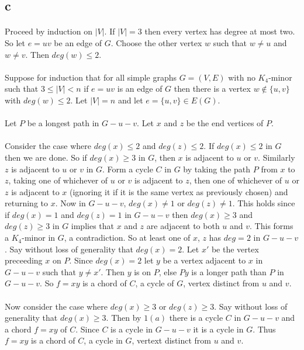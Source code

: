 \documentclass[letterpaper,12pt,oneside,onecolumn]{report}
\begin{document}
\subsection*{c}
\paragraph{}
Proceed by induction on $|V|$. If $|V|=3$ then every vertex has degree at most two. So let $e=uv$ be an edge of $G$. Choose the other vertex $w$ such that $w \neq u$ and $w \neq v$. Then $deg(w) \leq 2$.
\paragraph{}
Suppose for induction that for all simple graphs $G=(V,E)$ with no $K_4$-minor such that $3 \leq |V| < n$ if $e=uv$ is an edge of $G$ then there is a vertex $w \not\in \{u,v\}$ with $deg(w) \leq 2$. 
Let $|V| = n$ and let $e = \{u,v\} \in E(G)$.
\paragraph{} 
Let $P$ be a longest path in $G - u - v$. Let $x$ and $z$ be the end vertices of $P$.
\paragraph{}
Consider the case where $deg(x) \leq 2$ and $deg(z) \leq 2$. If $deg(x) \leq 2$ in $G$ then we are done. So if $deg(x) \geq 3$ in $G$, then $x$ is adjacent to $u$ or $v$. Similarly $z$ is adjacent to $u$ or $v$ in $G$. Form a cycle $C$ in $G$ by taking the path $P$ from $x$ to $z$, taking one of whichever of $u$ or $v$ is adjacent to $z$, then one of whichever of $u$ or $z$ is adjacent to $x$ (ignoring it if it is the same vertex as previously chosen) and returning to $x$. Now in $G-u-v$, $deg(x) \neq 1$ or $deg(z) \neq 1$. This holds since if $deg(x) = 1$ and $deg(z) = 1$ in $G - u - v$ then $deg(x) \geq 3$ and $deg(z) \geq 3$ in $G$ implies that $x$ and $z$ are adjacent to both $u$ and $v$. This forms a $K_4$-minor in $G$, a contradiction. So at least one of $x$, $z$ has $deg = 2$ in $G - u - v$. Say without loss of generality that $deg(x) = 2$. Let $x'$ be the vertex preceeding $x$ on $P$.  Since $deg(x) = 2$ let $y$ be a vertex adjacent to $x$ in $G - u - v$ such that $y \neq x'$. Then $y$ is on $P$, else $Py$ is a longer path than $P$ in $G - u -v$. So $f = xy$ is a chord of $C$, a cycle of $G$, vertex distinct from $u$ and $v$.
\paragraph{}
Now consider the case where $deg(x) \geq 3$ or $deg(z) \geq 3$. Say without loss of generality that $deg(x) \geq 3$. Then by $1(a)$ there is a cycle $C$ in $G-u-v$ and a chord $f=xy$ of $C$. Since $C$ is a cycle in $G-u-v$ it is a cycle in $G$. Thus $f = xy$ is a chord of $C$, a cycle in $G$, vertext distinct from $u$ and $v$.
\end{document}
